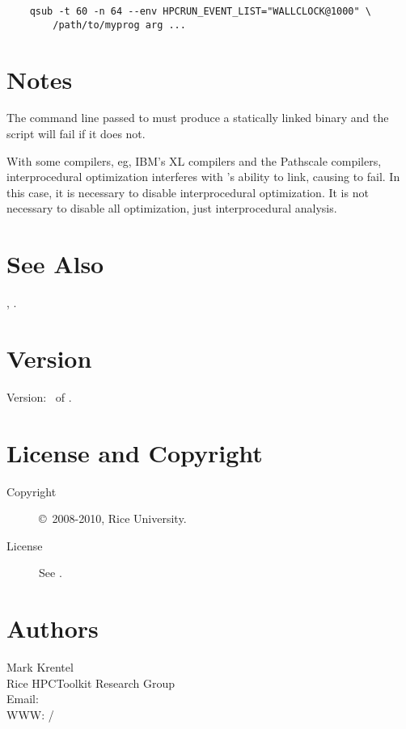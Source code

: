 \documentclass[english]{article}
\begin{document}
\begin{verbatim}
    qsub -t 60 -n 64 --env HPCRUN_EVENT_LIST="WALLCLOCK@1000" \
        /path/to/myprog arg ...
\end{verbatim}


\section{Notes}

The command line passed to  must produce a statically
linked binary and the \Prog{hpclink} script will fail if it does not.

With some compilers, eg, IBM's XL compilers and the Pathscale
compilers, interprocedural optimization interferes with
's ability to link, causing \Prog{hpclink} to fail.  In
this case, it is necessary to disable interprocedural optimization.
It is not necessary to disable all optimization, just interprocedural
analysis.


\section{See Also}

,
.

\section{Version}

Version: \Version\ of \Date.

\section{License and Copyright}

\begin{description}
\item[Copyright] \copyright\ 2008-2010, Rice University.
\item[License] See .
\end{description}

\section{Authors}

\noindent
Mark Krentel \\
Rice HPCToolkit Research Group \\
Email:  \\
WWW: /

\LatexManEnd
\end{document}
